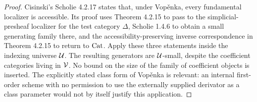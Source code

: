 \begin{proof}
Cisinski's Scholie 4.2.17 states that, under Vop\v{e}nka, every fundamental localizer is accessible. Its proof uses Theorem 4.2.15 to pass to the simplicial-presheaf localizer for the test category $\Delta$, Scholie 1.4.6 to obtain a small generating family there, and the accessibility-preserving inverse correspondence in Theorem 4.2.15 to return to $\mathrm{Cat}$. Apply these three statements inside the indexing universe $\mathcal U$. The resulting generators are $\mathcal U$-small, despite the coefficient categories living in $\mathcal V$. No bound on the size of the family of coefficient objects is inserted. The explicitly stated class form of Vop\v{e}nka is relevant: an internal first-order scheme with no permission to use the externally supplied derivator as a class parameter would not by itself justify this application.
\end{proof}

